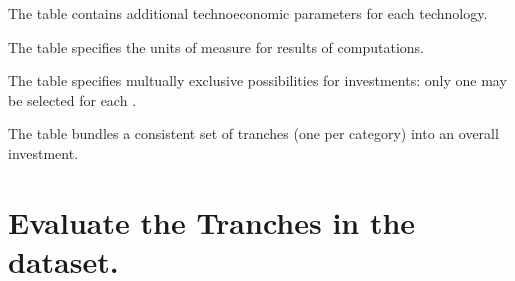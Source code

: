 \documentclass[letterpaper,10pt,english]{sphinxmanual}
\begin{document}
\begin{sphinxVerbatim}[commandchars=\\\{\}]
\end{sphinxVerbatim}



\sphinxAtStartPar
The  table contains additional techno\sphinxhyphen{}economic parameters for each technology.

\begin{sphinxVerbatim}[commandchars=\\\{\}]
\end{sphinxVerbatim}



\sphinxAtStartPar
The  table specifies the units of measure for results of computations.

\begin{sphinxVerbatim}[commandchars=\\\{\}]
\end{sphinxVerbatim}



\sphinxAtStartPar
The  table specifies multually exclusive possibilities for investments: only one  may be selected for each .

\begin{sphinxVerbatim}[commandchars=\\\{\}]
\end{sphinxVerbatim}



\sphinxAtStartPar
The  table bundles a consistent set of tranches (one per category) into an overall investment.

\begin{sphinxVerbatim}[commandchars=\\\{\}]
\end{sphinxVerbatim}




\section{Evaluate the Tranches in the dataset.}
\label{\detokenize{example-analysis:evaluate-the-tranches-in-the-dataset}}
\begin{sphinxVerbatim}[commandchars=\\\{\}]
  
\end{sphinxVerbatim}
\end{document}
